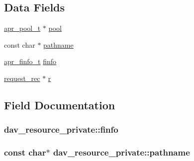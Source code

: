 \subsection*{Data Fields}
\begin{DoxyCompactItemize}
\item 
\hyperlink{structapr__pool__t}{apr\+\_\+pool\+\_\+t} $\ast$ \hyperlink{structdav__resource__private_ad180911d49f61626aef32667f087fa33}{pool}
\item 
const char $\ast$ \hyperlink{structdav__resource__private_a9221c2df9f33ac585e096b6a6963cf27}{pathname}
\item 
\hyperlink{structapr__finfo__t}{apr\+\_\+finfo\+\_\+t} \hyperlink{structdav__resource__private_a72e77fde5827fb82187d320871ebebf6}{finfo}
\item 
\hyperlink{structrequest__rec}{request\+\_\+rec} $\ast$ \hyperlink{structdav__resource__private_aa89e0e2a065d4506efb4720d7bb6c203}{r}
\end{DoxyCompactItemize}


\subsection{Field Documentation}
\subsubsection[{\texorpdfstring{finfo}{finfo}}]{ dav\+\_\+resource\+\_\+private\+::finfo}\hypertarget{structdav__resource__private_a72e77fde5827fb82187d320871ebebf6}{}\label{structdav__resource__private_a72e77fde5827fb82187d320871ebebf6}
\subsubsection[{\texorpdfstring{pathname}{pathname}}]{\setlength{\rightskip}{0pt plus 5cm}const char$\ast$ dav\+\_\+resource\+\_\+private\+::pathname}\hypertarget{structdav__resource__private_a9221c2df9f33ac585e096b6a6963cf27}{}\label{structdav__resource__private_a9221c2df9f33ac585e096b6a6963cf27}
